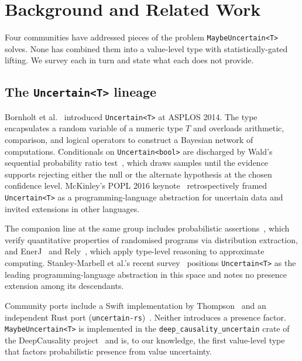 \section{Background and Related Work}
\label{sec:background}

Four communities have addressed pieces of the problem
\texttt{MaybeUncertain<T>} solves. None has combined them into a value-level
type with statistically-gated lifting. We survey each in turn and state what
each does not provide.

\subsection{The \texttt{Uncertain<T>} lineage}
\label{sec:bg:uncertain}

Bornholt et al.~\cite{bornholt2014uncertain,bornholt2013thesis}
introduced \texttt{Uncertain<T>} at ASPLOS 2014. The type encapsulates a
random variable of a numeric type $T$ and overloads arithmetic, comparison,
and logical operators to construct a Bayesian network of computations.
Conditionals on \texttt{Uncertain<bool>} are discharged by Wald's sequential
probability ratio test~\cite{wald1945sprt,wald1948optimum}, which
draws samples until the evidence supports rejecting either the null or the
alternate hypothesis at the chosen confidence level. McKinley's POPL 2016
keynote~\cite{mckinley2016popl} retrospectively framed
\texttt{Uncertain<T>} as a programming-language abstraction for uncertain data
and invited extensions in other languages.

The companion line at the same group includes probabilistic
assertions~\cite{sampson2014passert}, which verify quantitative properties of
randomised programs via distribution extraction, and
EnerJ~\cite{sampson2011enerj} and Rely~\cite{carbin2013rely}, which apply
type-level reasoning to approximate computing. Stanley-Marbell et al.'s recent
survey~\cite{stanley2025approxsurvey} positions \texttt{Uncertain<T>} as the
leading programming-language abstraction in this space and notes no presence
extension among its descendants.

Community ports include a Swift implementation by Thompson~\cite{mattt2019swiftuncertain}
and an independent Rust port (\texttt{uncertain-rs})~\cite{uncertainrs}. Neither
introduces a presence factor. \texttt{MaybeUncertain<T>} is implemented in the
\texttt{deep\_causality\_uncertain} crate of the DeepCausality
project~\cite{hansen_deepcausality} and is, to our knowledge, the first
value-level type that factors probabilistic presence from value uncertainty.

